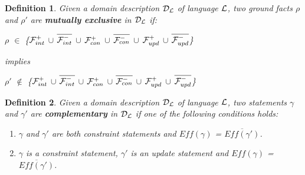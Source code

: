 \documentclass[11pt, twocolumn]{article}
\newtheorem{vdefinition}{Definition}
\newenvironment{vquote}
  {\begin{list}{}{\leftmargin 1em}\item[]}
  {\end{list}}
\begin{document}
        \begin{vdefinition}
          Given a domain description ${\cal D_{L}}$ of language ${\cal L}$,
          two ground facts $\rho$ and $\rho'$ are {\bf mutually exclusive} 
          in ${\cal D_{L}}$ if:
          \begin{vquote}
            $\rho$ $\in$ \{${\cal F}^{+}_{int}$ $\cup$
            $\overline{{\cal F}^{-}_{int}}$ $\cup$ ${\cal F}^{+}_{con}$ $\cup$
            $\overline{{\cal F}^{-}_{con}}$ $\cup$ ${\cal F}^{+}_{upd}$ $\cup$
            $\overline{{\cal F}^{-}_{upd}}$\}

            implies

            $\rho'$ $\not\in$ \{${\cal F}^{+}_{int}$ $\cup$
            $\overline{{\cal F}^{-}_{int}}$ $\cup$ ${\cal F}^{+}_{con}$ $\cup$
            $\overline{{\cal F}^{-}_{con}}$ $\cup$ ${\cal F}^{+}_{upd}$ $\cup$
            $\overline{{\cal F}^{-}_{upd}}$\}
          \end{vquote}
        \end{vdefinition}

        \begin{vdefinition}
          Given a domain description ${\cal D_{L}}$ of language ${\cal L}$,
          two statements $\gamma$ and $\gamma'$ are {\bf complementary} in
          ${\cal D_{L}}$ if one of the following conditions holds:
          \begin{enumerate}
            \item
              $\gamma$ and $\gamma'$ are both constraint statements and
              $Eff(\gamma)$ = $\overline{Eff(\gamma')}$.
            \item
              $\gamma$ is a constraint statement, $\gamma'$ is an update
              statement and $Eff(\gamma)$ = $\overline{Eff(\gamma')}$.
          \end{enumerate}
        \end{vdefinition}
\end{document}
